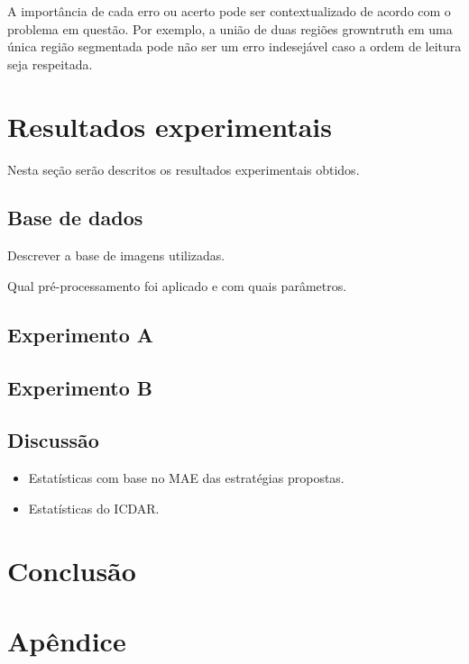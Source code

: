 \documentclass[a4paper,11pt]{article}
\begin{document}
      A importância de cada erro ou acerto pode ser contextualizado de acordo com o problema em questão. Por exemplo, a união de duas regiões growntruth em uma única região segmentada pode não ser um erro indesejável caso a ordem de leitura seja respeitada.





\section{Resultados experimentais}

Nesta seção serão descritos os resultados experimentais obtidos.

\subsection{Base de dados}
Descrever a base de imagens utilizadas.

Qual pré-processamento foi aplicado e com quais parâmetros.


\subsection{Experimento A}

\subsection{Experimento B}


\subsection{Discussão}

      \begin{itemize}
        \item Estatísticas com base no MAE das estratégias propostas.
        \item Estatísticas do ICDAR.
      \end{itemize}



\section{Conclusão}




\section{Apêndice}
\end{document}
